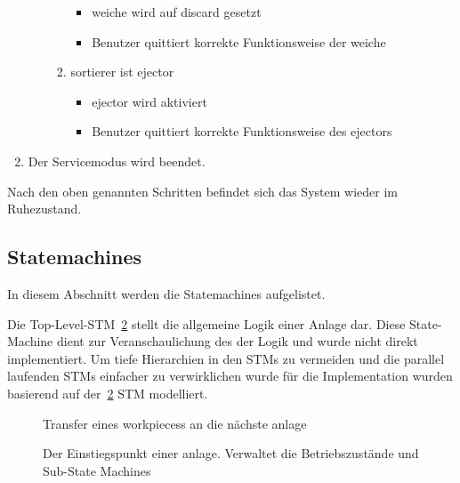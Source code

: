 \begin{enumerate}
\begin{enumerate}
\begin{enumerate}
\begin{itemize}
                \item \gls{weiche} wird auf \gls{discard} gesetzt
                \item Benutzer quittiert korrekte Funktionsweise der \gls{weiche}
            \end{itemize}
            \item \gls{sortierer} ist \gls{ejector}
            \begin{itemize}
                \item \Gls{ejector} wird aktiviert
                \item Benutzer quittiert korrekte Funktionsweise des \gls{ejector}s
            \end{itemize}
        \end{enumerate}
    \end{enumerate}
    \item Der Servicemodus wird beendet.
\end{enumerate}
Nach den oben genannten Schritten befindet sich das System wieder im Ruhezustand.

\clearpage
\subsection{Statemachines}\label{subsec:stm}
In diesem Abschnitt werden die Statemachines aufgelistet.

Die Top-Level-STM~\ref{fig:stm_top_level} stellt die allgemeine Logik einer Anlage dar.
Diese State-Machine dient zur Veranschaulichung des der Logik und wurde nicht direkt implementiert.
Um tiefe Hierarchien in den STMs zu vermeiden und die parallel laufenden STMs einfacher zu verwirklichen wurde
für die Implementation wurden basierend auf der~\ref{fig:stm_top_level} STM modelliert.

\begin{figure}[h]
    \caption{Transfer eines \glspl{workpiece}s an die nächste \gls{anlage}}
    \label{fig:stm_workpiece_transfer}
\end{figure}

\begin{figure}
    \caption{Der Einstiegspunkt einer \gls{anlage}.
    Verwaltet die Betriebszustände und Sub-State Machines}
    \label{fig:stm_top_level}
\end{figure}

